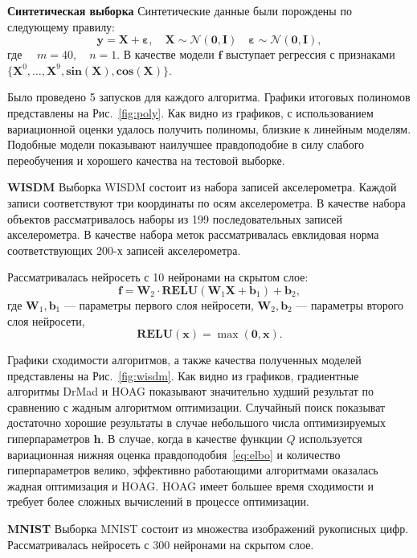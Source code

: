 \textbf{Синтетическая выборка}
Синтетические данные были порождены по следующему правилу:
\[
	\mathbf{y} = \mathbf{X} + \boldsymbol{\varepsilon},\quad \mathbf{X}  \sim \mathcal{N}(\mathbf{0}, \mathbf{I}) \quad \boldsymbol{\varepsilon} \sim \mathcal{N}(\mathbf{0}, \mathbf{I}),
\]
где $\quad m = 40, \quad n = 1.$
В качестве модели $\mathbf{f}$ выступает регрессия с признаками $\{\mathbf{X}^0, \dots, \mathbf{X}^9, \textbf{sin}(\mathbf{X}), \textbf{cos}(\mathbf{X})\}$.

Было проведено 5 запусков для каждого алгоритма.
Графики итоговых полиномов представлены на Рис.~\ref{fig:poly}. Как видно из графиков, с использованием вариационной оценки удалось получить полиномы, близкие к линейным моделям. Подобные модели показывают наилучшее правдоподобие в силу слабого переобучения и хорошего качества на тестовой выборке. 


\textbf{WISDM}
Выборка WISDM состоит из набора записей акселерометра. Каждой записи соответствуют три координаты по осям акселерометра. В качестве набора объектов рассматривалось наборы из 199 последовательных записей акселерометра. В качестве набора меток рассматривалась евклидовая норма соответствующих 200-х записей акселерометра.

Рассматривалась нейросеть с 10 нейронами на скрытом слое:
\[
    \mathbf{f} = \mathbf{W}_2 \cdot \textbf{RELU}(\mathbf{W}_1\mathbf{X} + \mathbf{b}_1) +\mathbf{b}_2,
\]
где $\mathbf{W}_1, \mathbf{b}_1$ --- параметры первого слоя нейросети,
$\mathbf{W}_2, \mathbf{b}_2$ --- параметры второго слоя нейросети,
\[
    \textbf{RELU}(\mathbf{x}) = \max(\mathbf{0}, \mathbf{x}).
\]

Графики сходимости алгоритмов, а также качества полученных моделей представлены на Рис.~\ref{fig:wisdm}.
Как видно из графиков, градиентные алгоритмы DrMad и HOAG показывают значительно худший результат по сравнению с жадным алгоритмом оптимизации. Случайный поиск показыват достаточно хорошие результаты в случае небольшого числа оптимизируемых гиперпараметров $\mathbf{h}$. В случае, когда в качестве функции $Q$ используется вариационная нижняя оценка правдоподобия~\eqref{eq:elbo} и количество гиперпараметров велико, эффективно работающими алгоритмами оказалась жадная оптимизация и HOAG. HOAG имеет большее время сходимости и требует более сложных вычислений в процессе оптимизации.


\textbf{MNIST}
Выборка MNIST состоит из множества изображений рукописных цифр.
Рассматривалась нейросеть с 300 нейронами на скрытом слое.

